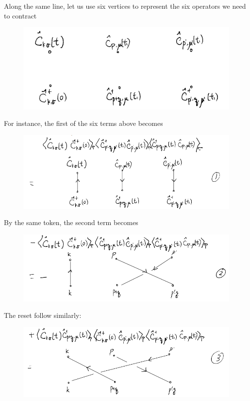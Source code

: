 Along the same line, let us use six vertices to represent the six operators we need to contract

\begin{figure}[ht]
    \centering
    \includegraphics[width=\textwidth]{jupyterbook/data/fig/lec16-fig06.png}
\end{figure}

For instance, the first of the six terms above becomes

\begin{figure}[ht]
    \centering
    \includegraphics[width=\textwidth]{jupyterbook/data/fig/lec16-fig07.png}
\end{figure}

By the same token, the second term becomes

\begin{figure}[ht]
    \centering
    \includegraphics[width=\textwidth]{jupyterbook/data/fig/lec16-fig08.png}
\end{figure}

The reset follow similarly:

\begin{figure}[ht]
    \centering
    \includegraphics[width=\textwidth]{jupyterbook/data/fig/lec16-fig09.png}
\end{figure}


